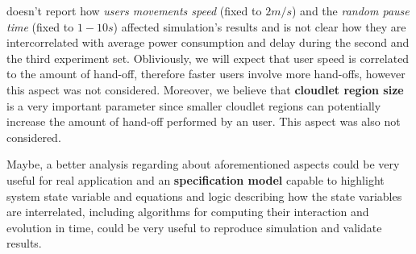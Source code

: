 \documentclass[sigchi]{acmart}
\begin{document}
\citet{MSAReport} doesn't report how \textit{users movements speed} (fixed to $2 m/s$) and the \textit{random pause time} (fixed to $1-10 s$) affected simulation's results and is not clear how they are intercorrelated with average power consumption and delay during the second and the third experiment set. Obliviously, we will expect that user speed is correlated to the amount of hand-off, therefore faster users involve more hand-offs, however this aspect was not considered. Moreover, we believe that \textbf{cloudlet region size} is a very important parameter since smaller cloudlet regions can potentially increase the amount of hand-off performed by an user. This aspect was also not considered.

Maybe, a better analysis regarding about aforementioned aspects could be very useful for real application and an \textbf{specification model} capable to highlight system state variable and equations and logic describing how the state variables are interrelated, including algorithms for computing their interaction and evolution in time, could be very useful to reproduce simulation and validate \citep{MSAReport} results.




\appendix
\end{document}
